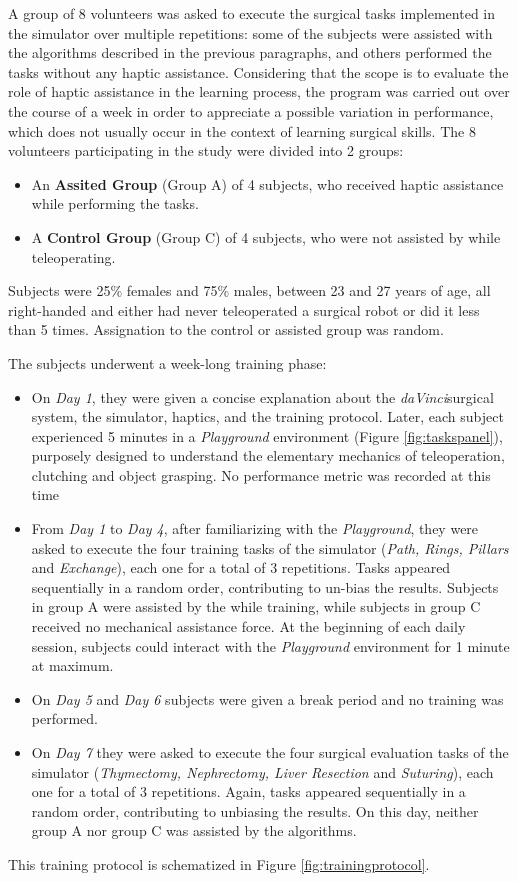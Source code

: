 \documentclass[../main.tex]{subfiles}
\begin{document}
A group of 8 volunteers was asked to execute the surgical tasks implemented in the simulator over multiple repetitions: some of the subjects were assisted with the \vf algorithms described in the previous paragraphs, and others performed the tasks without any haptic assistance. Considering that the scope is to evaluate the role of haptic assistance in the learning process, the program was carried out over the course of a week in order to appreciate a possible variation in performance, which does not usually occur in the context of learning surgical skills.
The 8 volunteers participating in the study were divided into 2 groups:
\begin{itemize}
    \item An \textbf{Assited Group} (Group A) of 4 subjects, who received haptic assistance while performing the tasks.
    \item A \textbf{Control Group} (Group C) of 4 subjects, who were not assisted by \vfs while teleoperating.
\end{itemize}

Subjects were 25\% females and 75\% males, between 23 and 27 years of age, all right-handed and either had never teleoperated a surgical robot or did it less than 5 times. Assignation to the control or assisted group was random.

The subjects underwent a week-long training phase:
\begin{itemize}
  \item On \textit{Day 1}, they were given a concise explanation about the \textit{daVinci}\cright surgical system, the simulator, haptics, and the training protocol. Later, each subject experienced 5 minutes in a \textit{Playground} environment (Figure \ref{fig:taskspanel}), purposely designed to understand the elementary mechanics of teleoperation, clutching and object grasping. No performance metric was recorded at this time
  \item From \textit{Day 1} to \textit{Day 4}, after familiarizing with the \textit{Playground}, they were asked to execute the four training tasks of the simulator (\textit{Path, Rings, Pillars} and \textit{Exchange}), each one for a total of 3 repetitions. Tasks appeared sequentially in a random order, contributing to un-bias the results. Subjects in group A were assisted by the \vfs while training, while subjects in group C received no mechanical assistance force. At the beginning of each daily session, subjects could interact with the \textit{Playground} environment for 1 minute at maximum.  
  \item On \textit{Day 5} and \textit{Day 6} subjects were given a break period and no training was performed.
  \item On \textit{Day 7} they were asked to execute the four surgical evaluation tasks of the simulator (\textit{Thymectomy, Nephrectomy, Liver Resection} and \textit{Suturing}), each one for a total of 3 repetitions. Again, tasks appeared sequentially in a random order, contributing to unbiasing the results. On this day, neither group A nor group C was assisted by the \vf algorithms.
\end{itemize}
This training protocol is schematized in Figure \ref{fig:trainingprotocol}. 
\end{document}
